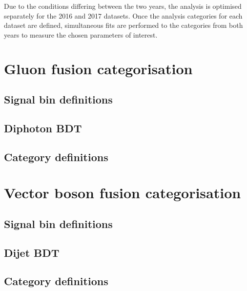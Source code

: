 Due to the conditions differing between the two years, 
the analysis is optimised separately for the 2016 and 2017 datasets. 
Once the analysis categories for each dataset are defined, simultaneous fits are
performed to the categories from both years to measure the chosen parameters of interest. 

\section{Gluon fusion categorisation}
\subsection{Signal bin definitions}
\subsection{Diphoton BDT}
\subsection{Category definitions}

\section{Vector boson fusion categorisation}
\subsection{Signal bin definitions}
\subsection{Dijet BDT}
\subsection{Category definitions}
